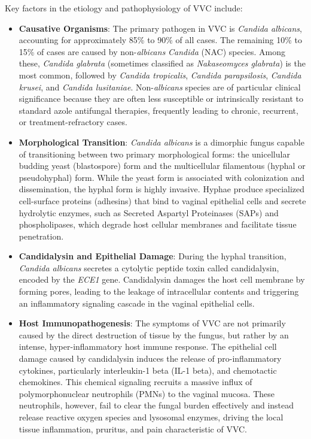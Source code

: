 Key factors in the etiology and pathophysiology of VVC include:
\begin{itemize}
    \item \textbf{Causative Organisms}: The primary pathogen in VVC is \textit{Candida albicans}, accounting for approximately 85\% to 90\% of all cases. The remaining 10\% to 15\% of cases are caused by non-\textit{albicans} \textit{Candida} (NAC) species. Among these, \textit{Candida glabrata} (sometimes classified as \textit{Nakaseomyces glabrata}) is the most common, followed by \textit{Candida tropicalis}, \textit{Candida parapsilosis}, \textit{Candida krusei}, and \textit{Candida lusitaniae}. Non-\textit{albicans} species are of particular clinical significance because they are often less susceptible or intrinsically resistant to standard azole antifungal therapies, frequently leading to chronic, recurrent, or treatment-refractory cases.
    \item \textbf{Morphological Transition}: \textit{Candida albicans} is a dimorphic fungus capable of transitioning between two primary morphological forms: the unicellular budding yeast (blastospore) form and the multicellular filamentous (hyphal or pseudohyphal) form. While the yeast form is associated with colonization and dissemination, the hyphal form is highly invasive. Hyphae produce specialized cell-surface proteins (adhesins) that bind to vaginal epithelial cells and secrete hydrolytic enzymes, such as Secreted Aspartyl Proteinases (SAPs) and phospholipases, which degrade host cellular membranes and facilitate tissue penetration.
    \item \textbf{Candidalysin and Epithelial Damage}: During the hyphal transition, \textit{Candida albicans} secretes a cytolytic peptide toxin called candidalysin, encoded by the \textit{ECE1} gene. Candidalysin damages the host cell membrane by forming pores, leading to the leakage of intracellular contents and triggering an inflammatory signaling cascade in the vaginal epithelial cells.
    \item \textbf{Host Immunopathogenesis}: The symptoms of VVC are not primarily caused by the direct destruction of tissue by the fungus, but rather by an intense, hyper-inflammatory host immune response. The epithelial cell damage caused by candidalysin induces the release of pro-inflammatory cytokines, particularly interleukin-1 beta (IL-1 beta), and chemotactic chemokines. This chemical signaling recruits a massive influx of polymorphonuclear neutrophils (PMNs) to the vaginal mucosa. These neutrophils, however, fail to clear the fungal burden effectively and instead release reactive oxygen species and lysosomal enzymes, driving the local tissue inflammation, pruritus, and pain characteristic of VVC.

\end{itemize}
